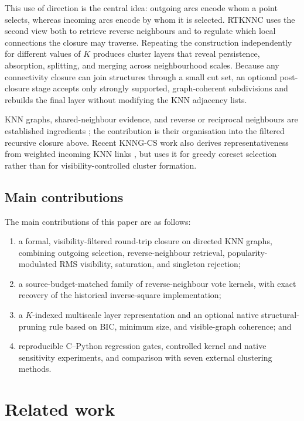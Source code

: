 \documentclass[pdflatex,sn-mathphys-num]{sn-jnl}
\begin{document}
This use of direction is the central idea: outgoing arcs encode whom a point
selects, whereas incoming arcs encode by whom it is selected. RTKNNC uses the
second view both to retrieve reverse neighbours and to regulate which local
connections the closure may traverse. Repeating the construction independently
for different values of $K$ produces cluster layers that reveal persistence,
absorption, splitting, and merging across neighbourhood scales. Because any
connectivity closure can join structures through a small cut set, an optional
post-closure stage accepts only strongly supported, graph-coherent subdivisions
and rebuilds the final layer without modifying the KNN adjacency lists.

KNN graphs, shared-neighbour evidence, and reverse or reciprocal neighbours are
established ingredients
\citep{JarvisPatrick1973,Ertoz2003SNN,BritoChavezQuirozYukich1997,ChowdhuryAmorim2018,XieLeeWangChenZhou2019}; the contribution is their organisation into the filtered recursive closure above. Recent KNNG-CS work also derives representativeness from weighted incoming KNN links \citep{LiuEtAl2026KNNGCS}, but uses it for greedy coreset selection rather than for visibility-controlled cluster formation.

\subsection{Main contributions}

The main contributions of this paper are as follows:
\begin{enumerate}
\item a formal, visibility-filtered round-trip closure on directed KNN graphs,
combining outgoing selection, reverse-neighbour retrieval, popularity-modulated
RMS visibility, saturation, and singleton rejection;
\item a source-budget-matched family of reverse-neighbour vote kernels, with
exact recovery of the historical inverse-square implementation;
\item a $K$-indexed multiscale layer representation and an optional native
structural-pruning rule based on BIC, minimum size, and visible-graph
coherence; and
\item reproducible C--Python regression gates, controlled kernel and native
sensitivity experiments, and comparison with seven external clustering
methods.
\end{enumerate}

\section{Related work}\label{sec:related}
\end{document}
